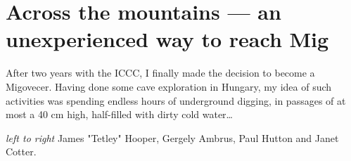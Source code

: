 \section{Across the mountains --- an unexperienced way to reach
Mig}

After two years with the ICCC, I finally made the decision to become a
Migovecer. Having done some cave exploration in Hungary, my idea of such
activities was spending endless hours of underground digging, in
passages of at most a 40 cm high, half-filled with dirty cold
water\ldots{}

\begin{marginfigure}
\checkoddpage \ifoddpage \forcerectofloat \else \forceversofloat \fi
\centering
 \caption{\textit{left to right} James "Tetley" Hooper, Gergely Ambrus, Paul Hutton and Janet Cotter. }
 \label{group 2008}
\end{marginfigure}

